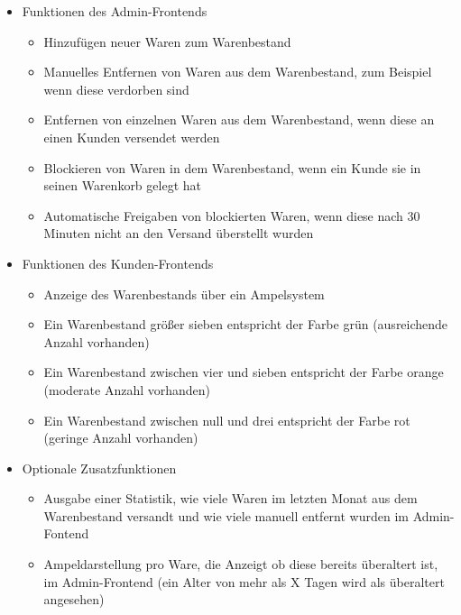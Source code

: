 \begin{itemize}
	\item Funktionen des Admin-Frontends
	\begin{itemize}
		\item Hinzufügen neuer Waren zum Warenbestand
		\item Manuelles Entfernen von Waren aus dem Warenbestand, zum Beispiel wenn diese verdorben sind
		\item Entfernen von einzelnen Waren aus dem Warenbestand, wenn diese an einen Kunden versendet werden
		\item Blockieren von Waren in dem Warenbestand, wenn ein Kunde sie in seinen Warenkorb gelegt hat
		\item Automatische Freigaben von blockierten Waren, wenn diese nach 30 Minuten nicht an den Versand überstellt wurden
	\end{itemize}
	\item Funktionen des Kunden-Frontends
	\begin{itemize}
		\item Anzeige des Warenbestands über ein Ampelsystem 
		\item Ein Warenbestand größer sieben entspricht der Farbe grün (ausreichende Anzahl vorhanden)
		\item Ein Warenbestand zwischen vier und sieben entspricht der Farbe orange (moderate Anzahl vorhanden)		
		\item Ein Warenbestand zwischen null und drei entspricht der Farbe rot (geringe Anzahl vorhanden)
	\end{itemize}
	\item Optionale Zusatzfunktionen
	\begin{itemize}
		\item Ausgabe einer Statistik, wie viele Waren im letzten Monat aus dem Warenbestand versandt und wie viele manuell entfernt wurden im Admin-Fontend
		\item Ampeldarstellung pro Ware, die Anzeigt ob diese bereits überaltert ist, im Admin-Frontend (ein Alter von mehr als X Tagen wird als überaltert angesehen)
	\end{itemize}
\end{itemize}
